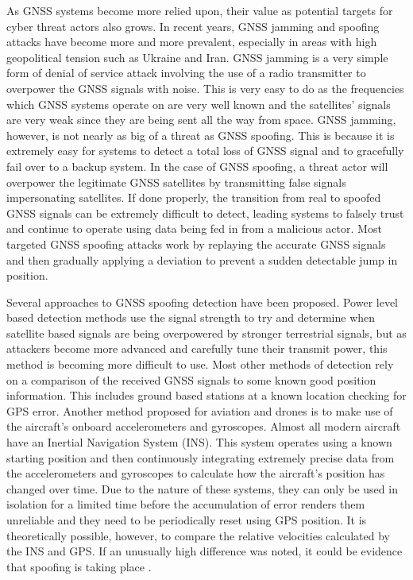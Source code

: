 \documentclass[conference]{IEEEtran}
\begin{document}
As GNSS systems become more relied upon, their value as potential targets for cyber threat actors also grows.  In recent years, GNSS jamming and spoofing attacks have become more and more prevalent, especially in areas with high geopolitical tension such as Ukraine and Iran.
GNSS jamming is a very simple form of denial of service attack involving the use of a radio transmitter to overpower the GNSS signals with noise.  This is very easy to do as the frequencies which GNSS systems operate on are very well known and the satellites’ signals are very weak since they are being sent all the way from space.
GNSS jamming, however, is not nearly as big of a threat as GNSS spoofing.  This is because it is extremely easy for systems to detect a total loss of GNSS signal and to gracefully fail over to a backup system.  In the case of GNSS spoofing, a threat actor will overpower the legitimate GNSS satellites by transmitting false signals impersonating satellites.  If done properly, the transition from real to spoofed GNSS signals can be extremely difficult to detect, leading systems to falsely trust and continue to operate using data being fed in from a malicious actor.  Most targeted GNSS spoofing attacks work by replaying the accurate GNSS signals and then gradually applying a deviation to prevent a sudden detectable jump in position.

Several approaches to GNSS spoofing detection have been proposed.  Power level based detection methods use the signal strength to try and determine when satellite based signals are being overpowered by stronger terrestrial signals, but as attackers become more advanced and carefully tune their transmit power, this method is becoming more difficult to use.  Most other methods of detection rely on a comparison of the received GNSS signals to some known good position information.  This includes ground based stations at a known location checking for GPS error.  Another method proposed for aviation and drones is to make use of the aircraft’s onboard accelerometers and gyroscopes.  Almost all modern aircraft have an Inertial Navigation System (INS).  This system operates using a known starting position and then continuously integrating extremely precise data from the accelerometers and gyroscopes to calculate how the aircraft’s position has changed over time.  Due to the nature of these systems, they can only be used in isolation for a limited time before the accumulation of error renders them unreliable and they need to be periodically reset using GPS position.  It is theoretically possible, however, to compare the relative velocities calculated by the INS and GPS.  If an unusually high difference was noted, it could be evidence that spoofing is taking place \cite{meng2021}.
\end{document}
